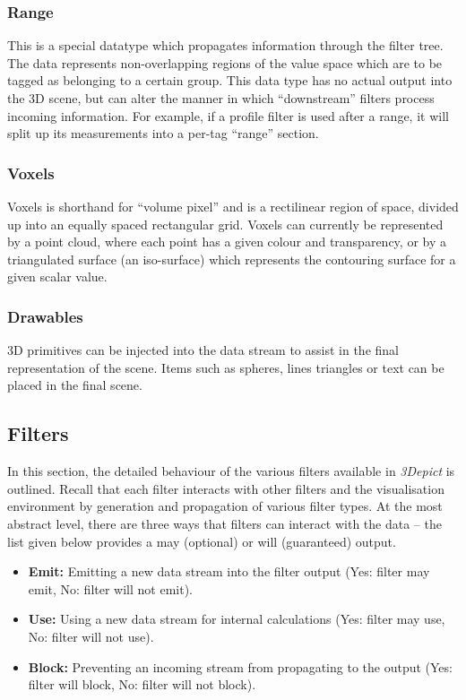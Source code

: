 \documentclass[10pt]{article}
\begin{document}
\subsubsection{Range}
This is a special datatype which propagates information through the filter tree. The data represents non-overlapping regions of the value space which are to be tagged as belonging to a certain group. This data type has no actual output into the 3D scene, but can alter the manner in which ``downstream'' filters process incoming information. For example, if a profile filter is used after a range, it will split up its measurements into a per-tag ``range'' section. 

\subsubsection{Voxels}
Voxels is shorthand for ``volume pixel'' and is a rectilinear region of space, divided up into an equally spaced rectangular grid. Voxels can currently be represented by a point cloud, where each point has a given colour and transparency, or by a triangulated surface (an iso-surface) which represents the contouring surface for a given scalar value.

\subsubsection{Drawables}
3D primitives can be injected into the data stream to assist in the final representation of the scene. Items such as spheres, lines triangles or text can be placed in the final scene.
 

\subsection{Filters}

In this section, the detailed behaviour of the various filters available in \emph{3Depict} is outlined. Recall that each filter interacts with other filters and the visualisation environment by generation and propagation of various filter types. At the most abstract level, there are three ways that filters can interact with the data -- the list given below provides a may (optional) or will (guaranteed) output.

\begin{itemize}
 \item \textbf{Emit:} Emitting a new data stream into the filter output (Yes: filter may emit, No: filter will not emit).
 \item \textbf{Use:} Using a new data stream for internal calculations (Yes: filter may use, No: filter will not use). 
 \item \textbf{Block:} Preventing an incoming stream from propagating to the output (Yes: filter will block, No: filter will not block).
\end{itemize} 
\end{document}
